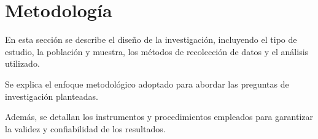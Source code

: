\section{Metodología}
\label{sec:metodologia}

En esta sección se describe el diseño de la investigación, incluyendo el tipo de estudio, la población y muestra, los métodos de recolección de datos y el análisis utilizado.

Se explica el enfoque metodológico adoptado para abordar las preguntas de investigación planteadas.

Además, se detallan los instrumentos y procedimientos empleados para garantizar la validez y confiabilidad de los resultados.